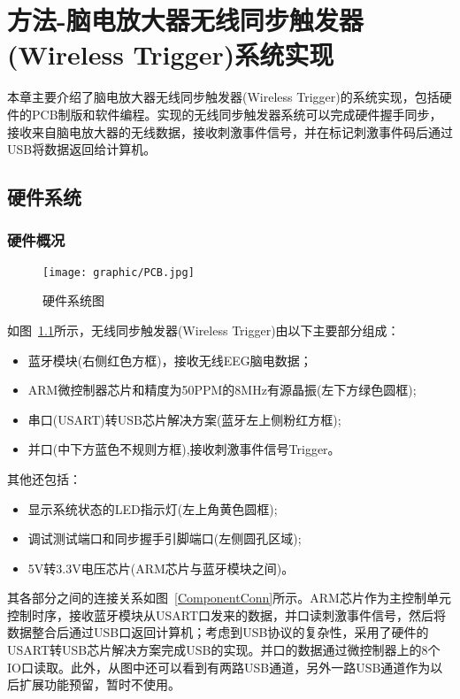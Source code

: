 \chapter[方法-系统实现]{方法-脑电放大器无线同步触发器(Wireless Trigger)系统实现\label{chp:implementation}}

本章主要介绍了脑电放大器无线同步触发器(Wireless Trigger)的系统实现，包括硬件的PCB制版和软件编程。实现的无线同步触发器系统可以完成硬件握手同步，接收来自脑电放大器的无线数据，接收刺激事件信号，并在标记刺激事件码后通过USB将数据返回给计算机。

\section{硬件系统}

\subsection{硬件概况}

\begin{figure}[!hbp]
\begin{center}
\texttt{[image: graphic/PCB.jpg]}
\caption{硬件系统图 \label{hardwarePCB}}
\end{center}
\end{figure}

如图~\ref{hardwarePCB}所示，无线同步触发器(Wireless Trigger)由以下主要部分组成：
\begin{itemize}
\item 	蓝牙模块(右侧红色方框)，接收无线EEG脑电数据；
\item	ARM微控制器芯片和精度为50PPM的8MHz有源晶振(左下方绿色圆框);
\item  串口(USART)转USB芯片解决方案(蓝牙左上侧粉红方框);
\item 	并口(中下方蓝色不规则方框),接收刺激事件信号Trigger。
\end{itemize}

其他还包括：
\begin{itemize}
\item 显示系统状态的LED指示灯(左上角黄色圆框);
\item 调试测试端口和同步握手引脚端口(左侧圆孔区域);
\item 5V转3.3V电压芯片(ARM芯片与蓝牙模块之间)。
\end{itemize}

	其各部分之间的连接关系如图~\ref{ComponentConn}所示。ARM芯片作为主控制单元控制时序，接收蓝牙模块从USART口发来的数据，并口读刺激事件信号，然后将数据整合后通过USB口返回计算机；考虑到USB协议的复杂性，采用了硬件的USART转USB芯片解决方案完成USB的实现。并口的数据通过微控制器上的8个IO口读取。此外，从图中还可以看到有两路USB通道，另外一路USB通道作为以后扩展功能预留，暂时不使用。


